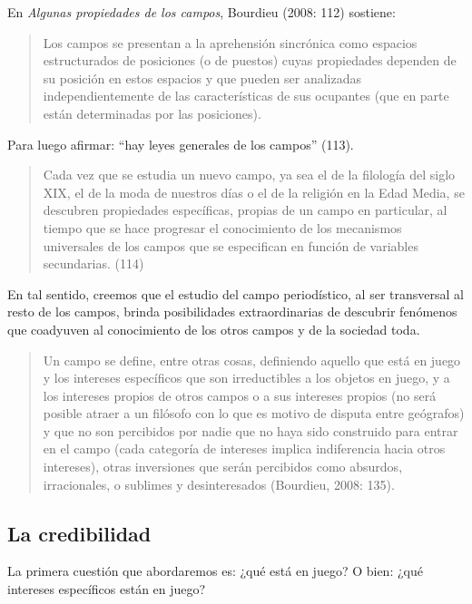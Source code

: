 En \emph{Algunas propiedades de los campos}, Bourdieu (2008: 112) sostiene:

\begin{quote}
	Los campos se presentan a la aprehensión sincrónica como espacios estructurados de posiciones (o de puestos) cuyas propiedades dependen de su posición en estos espacios y que pueden ser analizadas independientemente de las características de sus ocupantes (que en parte están determinadas por las posiciones).
\end{quote}

Para luego afirmar: \enquote{hay leyes generales de los campos} (113).

\begin{quote}
	Cada vez que se estudia un nuevo campo, ya sea el de la filología del siglo XIX, el de la moda de nuestros días o el de la religión en la Edad Media, se descubren propiedades específicas, propias de un campo en particular, al tiempo que se hace progresar el conocimiento de los mecanismos universales de los campos que se especifican en función de variables secundarias. (114)
\end{quote}


En tal sentido, creemos que el estudio del campo periodístico, al ser transversal al resto de los campos, brinda posibilidades extraordinarias de descubrir fenómenos que coadyuven al conocimiento de los otros campos y de la sociedad toda.

\begin{quote}
	Un campo  se define, entre otras cosas, definiendo aquello que está en juego y los intereses específicos que son irreductibles a los objetos en juego, y a los intereses propios de otros campos o a sus intereses propios (no será posible atraer a un filósofo con lo que es motivo de disputa entre geógrafos) y que no son percibidos por nadie que no haya sido construido para entrar en el campo (cada categoría de intereses implica indiferencia hacia otros intereses), otras inversiones que serán percibidos como absurdos, irracionales, o sublimes y desinteresados (Bourdieu, 2008: 135).
\end{quote}

\subsection {La credibilidad}

La primera cuestión que abordaremos es: ¿qué está en juego? O bien: ¿qué intereses específicos están en juego?

